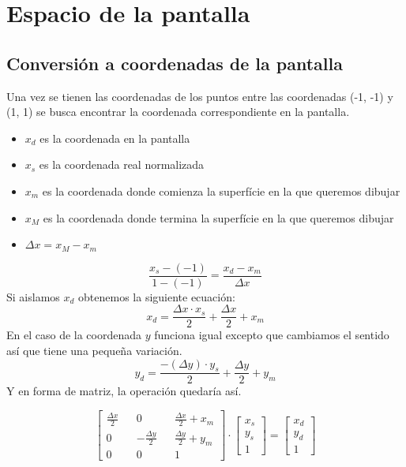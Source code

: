 \chapter{Espacio de la pantalla}
\section{Conversión a coordenadas de la pantalla}
Una vez se tienen las coordenadas de los puntos entre las coordenadas (-1, -1) y (1, 1) se busca encontrar la coordenada correspondiente en la pantalla.
\begin{itemize}
  \item{\(x_d\) es la coordenada en la pantalla}
  \item{\(x_s\) es la coordenada real normalizada}  
  \item{\(x_m\) es la coordenada donde comienza la superfície en la que queremos dibujar}
  \item{\(x_M\) es la coordenada donde termina la superfície en la que queremos dibujar}  
  \item{\(\Delta x = x_M - x_m\)}
\end{itemize}
\begin{equation*}
  \frac{x_s-(-1)}{1-(-1)} = \frac{x_d - x_m}{\Delta x}
\end{equation*}
Si aislamos \(x_d\) obtenemos la siguiente ecuación:
\begin{equation*}
  x_d = \frac{\Delta x \cdot x_s}{2}+\frac{\Delta x}{2}+x_m
\end{equation*}
En el caso de la coordenada \(y\) funciona igual excepto que cambiamos el sentido así que tiene una pequeña variación.
\begin{equation*}
  y_d = \frac{-(\Delta y) \cdot y_s}{2}+\frac{\Delta y}{2}+y_m
\end{equation*}
Y en forma de matriz, la operación quedaría así.

\begin{equation*}
  \begin{bmatrix}
     \frac{\Delta x}{2} && 0 && \frac{\Delta x}{2} + x_m\\
     0 && - \frac{\Delta y}{2} && \frac{\Delta y}{2} + y_m \\
     0 && 0 && 1
  \end{bmatrix}
  \cdot
  \begin{bmatrix}
    x_s\\
    y_s\\
    1
  \end{bmatrix}
  =
  \begin{bmatrix}
    x_d\\
    y_d\\
    1
  \end{bmatrix}
\end{equation*}
\restoregeometry

